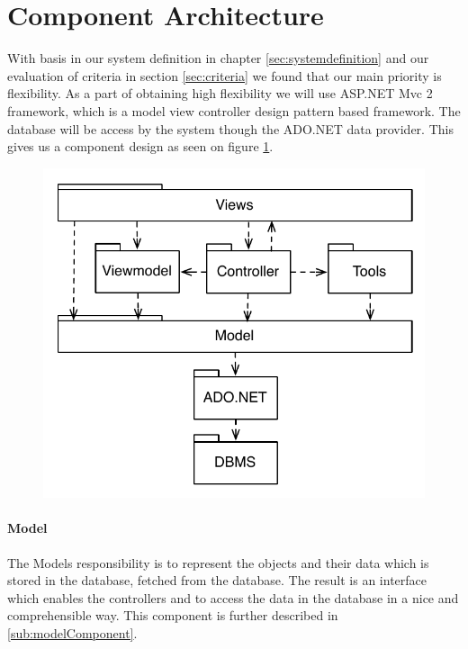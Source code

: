 \section{Component Architecture}
\label{sec:components}
With basis in our system definition in chapter \ref{sec:systemdefinition} and our evaluation of criteria in section \ref{sec:criteria} we found that our main priority is flexibility. 
As a part of obtaining high flexibility we will use ASP.NET Mvc 2 framework, which is a model view controller design pattern based framework.
The database will be access by the system though the ADO.NET data provider. This gives us a component design as seen on figure \ref{fig:system_component_mvc}. 

\begin{figure}
	\centering
		\includegraphics[scale=0.8]{input/architectural_design/system_component_mvc.pdf}
	\label{fig:system_component_mvc}
\end{figure}

\paragraph{Model}
The Models responsibility is to represent the objects and their data which is stored in the database, fetched from the database. The result is an interface which enables the controllers and \viewmodel[] to access the data in the database in a nice and comprehensible way. This component is further described in \ref{sub:modelComponent}.

